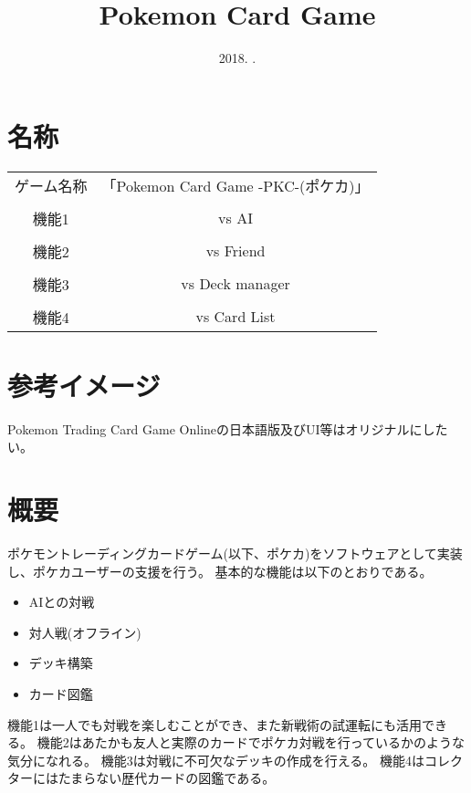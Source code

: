 \documentclass[a4paper]{jarticle}
\title{Pokemon Card Game}
\date{2018. . }
\author{}
\begin{document}
\maketitle
\newpage
\tableofcontents

\listoftables

\listoffigures
\newpage
\section{名称}
\begin{table}[H]
  \begin{tabular}{cc}
    ゲーム名称 & 「Pokemon Card Game -PKC-(ポケカ)」\\
    &\\
    機能1 & vs AI \\
    &\\
    機能2 & vs Friend \\
    &\\
    機能3 & vs Deck manager\\
    &\\
    機能4 & vs Card List \\

  \end{tabular}
\end{table}

\section{参考イメージ}
  Pokemon Trading Card Game Onlineの日本語版及びUI等はオリジナルにしたい。

\section{概要}
  ポケモントレーディングカードゲーム(以下、ポケカ)をソフトウェアとして実装し、ポケカユーザーの支援を行う。
  基本的な機能は以下のとおりである。
  \begin{itemize}
    \item AIとの対戦
    \item 対人戦(オフライン)
    \item デッキ構築
    \item カード図鑑
  \end{itemize}

  機能1は一人でも対戦を楽しむことができ、また新戦術の試運転にも活用できる。
  機能2はあたかも友人と実際のカードでポケカ対戦を行っているかのような気分になれる。
  機能3は対戦に不可欠なデッキの作成を行える。
  機能4はコレクターにはたまらない歴代カードの図鑑である。
\end{document}
